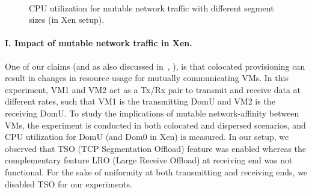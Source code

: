 \begin{figure}[t]
	\hspace{-0.3in}
	 ~~
	\caption{CPU utilization for mutable network traffic with different segment sizes (in Xen setup).}
	\label{fig:dom0rxtx}
\end{figure}

\paragraph{I. Impact of mutable network traffic in Xen.} 
One of our claims (and as also discussed 
in~\cite{virtual-putty}, \cite{starling}),
is that colocated provisioning can result in changes in
resource usage for mutually communicating VMs. %
In this experiment, VM1
and VM2 act as a Tx/Rx pair to transmit and receive data
at different rates, such that
VM1 is the transmitting DomU
and VM2 is the receiving DomU.
To study the implications of mutable network-affinity
between VMs, the experiment is conducted in both 
colocated and dispersed scenarios, and CPU utilization for
DomU (and Dom0 in Xen) is measured.
In our setup, we observed that TSO (TCP Segmentation
Offload) feature was
enabled whereas the complementary feature LRO (Large
Receive Offload) at
receiving end
was not functional. For the sake of
uniformity at both transmitting and receiving ends, we disabled
TSO for our experiments.

